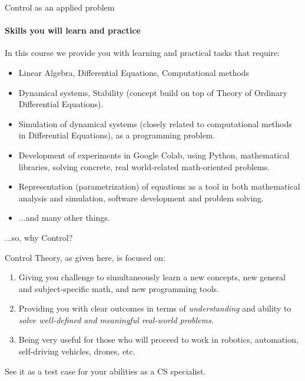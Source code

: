 \documentclass{beamer}
\begin{document}
\begin{frame}{Control as an applied problem}
\framesubtitle{Skills you will learn and practice}
\begin{flushleft}

In this course we provide you with learning and practical tasks that require:

\begin{itemize}
    \item Linear Algebra, Differential Equations, Computational methods
    \item Dynamical systems, Stability (concept build on top of Theory of Ordinary Differential Equations).
    
    \item Simulation of dynamical systems (closely related to computational methods in Differential Equations), as a programming problem.
    \item Development of experiments in Google Colab, using Python, mathematical libraries, solving concrete, real world-related math-oriented problems.
    
    \item Representation (parametrization) of equations as a tool in both mathematical analysis and simulation, software development and problem solving.
    
    \item ...and many other things.
\end{itemize}

\end{flushleft}
\end{frame}


\begin{frame}{...so, why Control?}
\begin{flushleft}

Control Theory, as given here, is focused on:

\begin{enumerate}
    \item Giving you challenge to simultaneously learn a new concepts, new general and subject-specific math, and new programming tools.
    \item Providing you with clear outcomes in terms of \emph{understanding} and ability to \emph{solve well-defined and meaningful real-world problems}.
    \item Being very useful for those who will proceed to work in robotics, automation, self-driving vehicles, drones, etc.
\end{enumerate}

See it as a test case for your abilities as a CS specialist.

\end{flushleft}
\end{frame}
\end{document}
